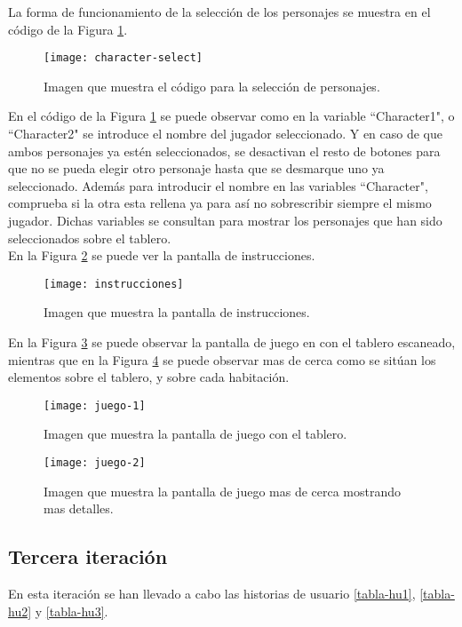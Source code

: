 La forma de funcionamiento de la selección de los personajes se muestra en el código de la Figura \ref{figura-character-select}.

\begin{figure}[!h]
  \centering
  \texttt{[image: character-select]}
  \caption{Imagen que muestra el código para la selección de personajes.}
  \label{figura-character-select}
\end{figure}

En el código de la Figura \ref{figura-character-select} se puede observar como en la variable ``Character1", o ``Character2" se introduce el nombre del jugador seleccionado. Y en caso de que ambos personajes ya estén seleccionados, se desactivan el resto de botones para que no se pueda elegir otro personaje hasta que se desmarque uno ya seleccionado. Además para introducir el nombre en las variables ``Character", comprueba si la otra esta rellena ya para así no sobrescribir siempre el mismo jugador. Dichas variables se consultan para mostrar los personajes que han sido seleccionados sobre el tablero.\\

En la Figura \ref{figura-instrucciones} se puede ver la pantalla de instrucciones.

\begin{figure}[h]
  \centering
  \texttt{[image: instrucciones]}
  \caption{Imagen que muestra la pantalla de instrucciones.}
  \label{figura-instrucciones}
\end{figure}


En la Figura \ref{figura-juego-1} se puede observar la pantalla de juego en con el tablero escaneado, mientras que en la Figura \ref{figura-juego-2} se puede observar mas de cerca como se sitúan los elementos sobre el tablero, y sobre cada habitación.

\begin{figure}[h]
  \centering
  \texttt{[image: juego-1]}
  \caption{Imagen que muestra la pantalla de juego con el tablero.}
  \label{figura-juego-1}
\end{figure}

\begin{figure}[h]
  \centering
  \texttt{[image: juego-2]}
  \caption{Imagen que muestra la pantalla de juego mas de cerca mostrando mas detalles.}
  \label{figura-juego-2}
\end{figure}

\FloatBarrier


\subsection{Tercera iteración}
En esta iteración se han llevado a cabo las historias de usuario \ref{tabla-hu1}, \ref{tabla-hu2} y \ref{tabla-hu3}.\\


